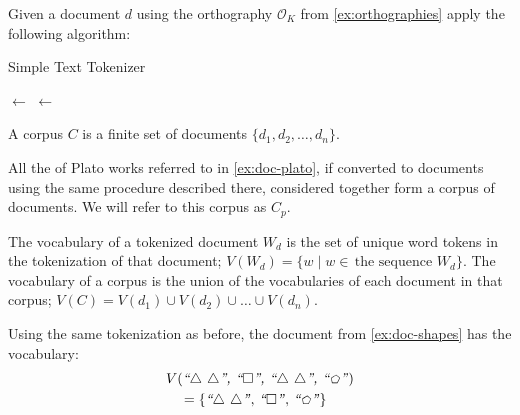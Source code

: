 \begin{example}\label{ex:t-simple}
  Given a document $d$ using the orthography $\mathscr{O}_K$ from \autoref{ex:orthographies} apply the following algorithm:
  \begin{algorithm}
    \caption{Simple Text Tokenizer}

    \BlankLine

    \Tokens $\leftarrow$ \List{}\;
    \NextToken $\leftarrow$ \List{}\;
  \end{algorithm}
\end{example}

\begin{definition}[Corpus]
  A corpus $C$ is a finite set of documents $\{d_1, d_2,\dots,d_n\}$.
\end{definition}

\begin{example}\label{ex:corp-plato}
  All the of Plato works referred to in \autoref{ex:doc-plato}, if converted to documents using the same procedure described there, considered together form a corpus of documents. We will refer to this corpus as $C_p$.
\end{example}

\begin{definition}[Vocabulary]
  The vocabulary of a tokenized document $W_d$ is the set of unique word tokens in the tokenization of that document; $V(W_d)=\{w\mid w\in\, \text{the sequence $W_d$}\}$. The vocabulary of a corpus is the union of the vocabularies of each document in that corpus; $V(C)=V(d_1)\cup V(d_2)\cup \dots\cup V(d_n)$.
\end{definition}

\begin{example}
  Using the same tokenization as before, the document from \autoref{ex:doc-shapes} has the vocabulary:
  \begin{align*}
    &V(\text{\emph{``$\triangle$ $\triangle$'', ``$\square$'', ``$\triangle$ $\triangle$'', ``$\pentagon$''}})\\
    &\quad=\{\text{\emph{``$\triangle$ $\triangle$''}},\, \text{\emph{``$\square$''}},\, \text{\emph{``$\pentagon$''}}\}
    \end{align*}
\end{example}
\vspace{6pt}

